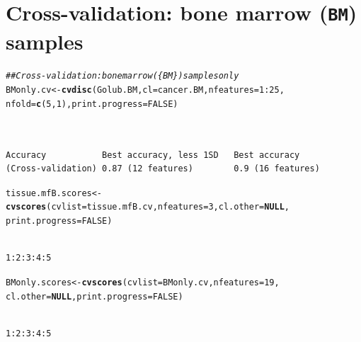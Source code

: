 \documentclass{article}\usepackage[]{graphicx}\usepackage[]{xcolor}
\makeatletter
\newcommand{\hlnum}[1]{\textcolor[rgb]{0.686,0.059,0.569}{#1}}%
\newcommand{\hlcom}[1]{\textcolor[rgb]{0.678,0.584,0.686}{\textit{#1}}}%
\newcommand{\hlopt}[1]{\textcolor[rgb]{0,0,0}{#1}}%
\newcommand{\hlstd}[1]{\textcolor[rgb]{0.345,0.345,0.345}{#1}}%
\newcommand{\hlkwa}[1]{\textcolor[rgb]{0.161,0.373,0.58}{\textbf{#1}}}%
\newcommand{\hlkwb}[1]{\textcolor[rgb]{0.69,0.353,0.396}{#1}}%
\newcommand{\hlkwc}[1]{\textcolor[rgb]{0.333,0.667,0.333}{#1}}%
\newcommand{\hlkwd}[1]{\textcolor[rgb]{0.737,0.353,0.396}{\textbf{#1}}}%
\newenvironment{kframe}{%
 \def\at@end@of@kframe{}%
 \ifinner\ifhmode%
  \def\at@end@of@kframe{\end{minipage}}%
  \begin{minipage}{\columnwidth}%
 \fi\fi%
 \def\FrameCommand##1{\hskip\@totalleftmargin \hskip-\fboxsep
 \colorbox{shadecolor}{##1}\hskip-\fboxsep
     \hskip-\linewidth \hskip-\@totalleftmargin \hskip\columnwidth}%
 \MakeFramed {\advance\hsize-\width
   \@totalleftmargin\z@ \linewidth\hsize
   \@setminipage}}%
 {\par\unskip\endMakeFramed%
 \at@end@of@kframe}
\newenvironment{knitrout}{}{} %
\makeatother
\begin{document}
\section{Cross-validation: bone marrow (\texttt{BM}) samples}
\begin{knitrout}
\color{fgcolor}\begin{kframe}
\begin{alltt}
\hlcom{##         Cross-validation: bone marrow (\{BM\}) samples only}
\hlstd{BMonly.cv} \hlkwb{<-} \hlkwd{cvdisc}\hlstd{(Golub.BM,} \hlkwc{cl}\hlstd{=cancer.BM,} \hlkwc{nfeatures}\hlstd{=}\hlnum{1}\hlopt{:}\hlnum{25}\hlstd{,}
                    \hlkwc{nfold}\hlstd{=}\hlkwd{c}\hlstd{(}\hlnum{5}\hlstd{,}\hlnum{1}\hlstd{),} \hlkwc{print.progress}\hlstd{=}\hlnum{FALSE}\hlstd{)}
\end{alltt}
\begin{verbatim}

                                                              
Accuracy           Best accuracy, less 1SD   Best accuracy    
(Cross-validation) 0.87 (12 features)        0.9 (16 features)
\end{verbatim}
\begin{alltt}
\hlstd{tissue.mfB.scores} \hlkwb{<-}
  \hlkwd{cvscores}\hlstd{(}\hlkwc{cvlist} \hlstd{= tissue.mfB.cv,} \hlkwc{nfeatures} \hlstd{=} \hlnum{3}\hlstd{,} \hlkwc{cl.other} \hlstd{=} \hlkwa{NULL}\hlstd{,}
           \hlkwc{print.progress}\hlstd{=}\hlnum{FALSE}\hlstd{)}
\end{alltt}
\begin{verbatim}

1:2:3:4:5
\end{verbatim}
\begin{alltt}
\hlstd{BMonly.scores} \hlkwb{<-} \hlkwd{cvscores}\hlstd{(}\hlkwc{cvlist}\hlstd{=BMonly.cv,} \hlkwc{nfeatures}\hlstd{=}\hlnum{19}\hlstd{,}
                          \hlkwc{cl.other}\hlstd{=}\hlkwa{NULL}\hlstd{,} \hlkwc{print.progress}\hlstd{=}\hlnum{FALSE}\hlstd{)}
\end{alltt}
\begin{verbatim}

1:2:3:4:5
\end{verbatim}
\end{kframe}
\end{knitrout}
\end{document}
